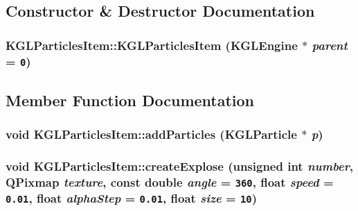 \subsection{Constructor \& Destructor Documentation}
\hypertarget{class_k_g_l_particles_item_f9d2aff0b3f2f6b8b2e188cf7c69b99d}{
\subsubsection[{KGLParticlesItem}]{\setlength{\rightskip}{0pt plus 5cm}KGLParticlesItem::KGLParticlesItem ({\bf KGLEngine} $\ast$ {\em parent} = {\tt 0})}}
\label{class_k_g_l_particles_item_f9d2aff0b3f2f6b8b2e188cf7c69b99d}




\subsection{Member Function Documentation}
\hypertarget{class_k_g_l_particles_item_e9b4281df0cdce181e5c72674d3b62fd}{
\subsubsection[{addParticles}]{\setlength{\rightskip}{0pt plus 5cm}void KGLParticlesItem::addParticles ({\bf KGLParticle} $\ast$ {\em p})}}
\label{class_k_g_l_particles_item_e9b4281df0cdce181e5c72674d3b62fd}


\hypertarget{class_k_g_l_particles_item_0d5e698526a16718ee51d33ef6c3c28d}{
\subsubsection[{createExplose}]{\setlength{\rightskip}{0pt plus 5cm}void KGLParticlesItem::createExplose (unsigned int {\em number}, \/  QPixmap {\em texture}, \/  const double {\em angle} = {\tt 360}, \/  float {\em speed} = {\tt 0.01}, \/  float {\em alphaStep} = {\tt 0.01}, \/  float {\em size} = {\tt 10})}}
\label{class_k_g_l_particles_item_0d5e698526a16718ee51d33ef6c3c28d}


